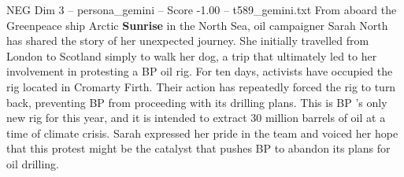\begin{textsample}{NEG Dim 3 – persona\_gemini – Score -1.00 – t589\_gemini.txt}  \label{ex:f3_neg_009}
From aboard the Greenpeace ship Arctic \textbf{Sunrise} in the North Sea, oil campaigner Sarah North has shared the story of her unexpected journey.
She initially travelled from London to Scotland simply to walk her dog, a trip that ultimately led to her involvement in protesting a BP oil rig.
For ten days, activists have occupied the rig located in Cromarty Firth.
Their action has repeatedly forced the rig to turn back, preventing BP from proceeding with its drilling plans.
This is BP 's only new rig for this year, and it is intended to extract 30 million barrels of oil at a time of climate crisis.
Sarah expressed her pride in the team and voiced her hope that this protest might be the catalyst that pushes BP to abandon its plans for oil drilling.

\end{textsample}
